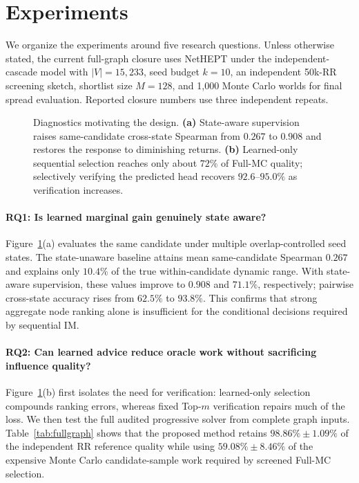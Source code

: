 \section{Experiments}
\label{sec:experiments}

We organize the experiments around five research questions. Unless otherwise stated, the current full-graph closure uses NetHEPT under the independent-cascade model with $|V|=15{,}233$, seed budget $k=10$, an independent 50k-RR screening sketch, shortlist size $M=128$, and 1,000 Monte Carlo worlds for final spread evaluation. Reported closure numbers use three independent repeats.

\begin{figure}[t]
    \centering
    \resizebox{0.98\linewidth}{!}{}
    \caption{Diagnostics motivating the design. \textbf{(a)} State-aware supervision raises same-candidate cross-state Spearman from $0.267$ to $0.908$ and restores the response to diminishing returns. \textbf{(b)} Learned-only sequential selection reaches only about $72\%$ of Full-MC quality; selectively verifying the predicted head recovers $92.6$--$95.0\%$ as verification increases.}
    \label{fig:diagnostics}
\end{figure}

\paragraph{RQ1: Is learned marginal gain genuinely state aware?}
Figure~\ref{fig:diagnostics}(a) evaluates the same candidate under multiple overlap-controlled seed states. The state-unaware baseline attains mean same-candidate Spearman $0.267$ and explains only $10.4\%$ of the true within-candidate dynamic range. With state-aware supervision, these values improve to $0.908$ and $71.1\%$, respectively; pairwise cross-state accuracy rises from $62.5\%$ to $93.8\%$. This confirms that strong aggregate node ranking alone is insufficient for the conditional decisions required by sequential IM.

\paragraph{RQ2: Can learned advice reduce oracle work without sacrificing influence quality?}
Figure~\ref{fig:diagnostics}(b) first isolates the need for verification: learned-only selection compounds ranking errors, whereas fixed Top-$m$ verification repairs much of the loss. We then test the full audited progressive solver from complete graph inputs. Table~\ref{tab:fullgraph} shows that the proposed method retains $98.86\%\pm1.09\%$ of the independent RR reference quality while using $59.08\%\pm8.46\%$ of the expensive Monte Carlo candidate-sample work required by screened Full-MC selection.

